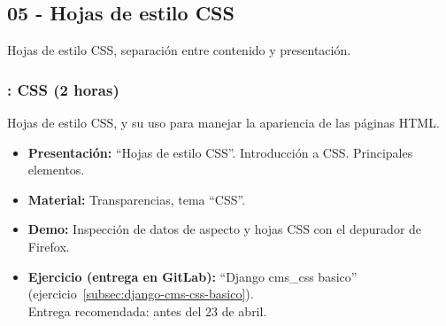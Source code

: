 \documentclass[a4paper,12pt]{article}
\begin{document}
%
%
%
%
\subsection{05 - Hojas de estilo CSS}

Hojas de estilo CSS, separación entre contenido y presentación.

\subsubsection{\martesK: CSS (2 horas)}
\label{cal:martesK}

Hojas de estilo CSS, y su uso para manejar la apariencia de las páginas HTML.

\begin{itemize}
\item \textbf{Presentación:} ``Hojas de estilo CSS''. Introducción a CSS. Principales elementos.
 \item \textbf{Material:} Transparencias, tema ``CSS''.
\item \textbf{Demo:} Inspección de datos de aspecto y hojas CSS con el depurador de Firefox.
\item \textbf{Ejercicio (entrega en GitLab):} ``Django cms\_css basico'' (ejercicio~\ref{subsec:django-cms-css-basico}). \\
  Entrega recomendada: antes del 23 de abril.
\end{itemize}
\end{document}
